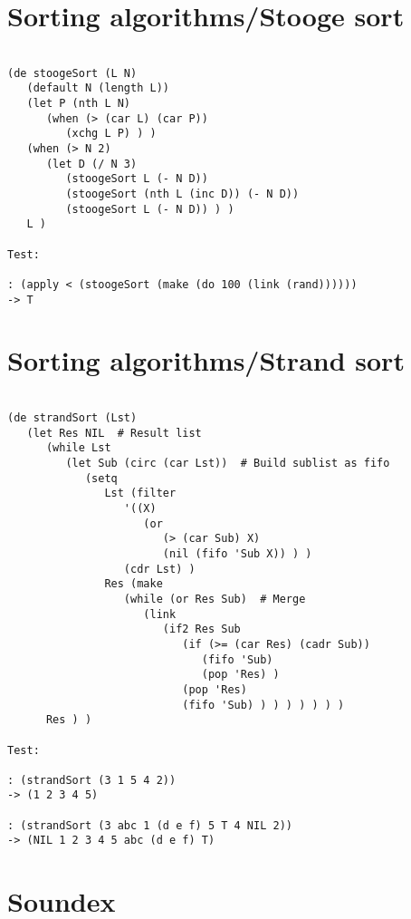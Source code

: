\section*{Sorting algorithms/Stooge sort}

\begin{verbatim}

(de stoogeSort (L N)
   (default N (length L))
   (let P (nth L N)
      (when (> (car L) (car P))
         (xchg L P) ) )
   (when (> N 2)
      (let D (/ N 3)
         (stoogeSort L (- N D))
         (stoogeSort (nth L (inc D)) (- N D))
         (stoogeSort L (- N D)) ) )
   L )

Test:

: (apply < (stoogeSort (make (do 100 (link (rand))))))
-> T

\end{verbatim}

\section*{Sorting algorithms/Strand sort}

\begin{verbatim}

(de strandSort (Lst)
   (let Res NIL  # Result list
      (while Lst
         (let Sub (circ (car Lst))  # Build sublist as fifo
            (setq
               Lst (filter
                  '((X)
                     (or
                        (> (car Sub) X)
                        (nil (fifo 'Sub X)) ) )
                  (cdr Lst) )
               Res (make
                  (while (or Res Sub)  # Merge
                     (link
                        (if2 Res Sub
                           (if (>= (car Res) (cadr Sub))
                              (fifo 'Sub)
                              (pop 'Res) )
                           (pop 'Res)
                           (fifo 'Sub) ) ) ) ) ) ) )
      Res ) )

Test:

: (strandSort (3 1 5 4 2))
-> (1 2 3 4 5)

: (strandSort (3 abc 1 (d e f) 5 T 4 NIL 2))
-> (NIL 1 2 3 4 5 abc (d e f) T)

\end{verbatim}

\section*{Soundex}

